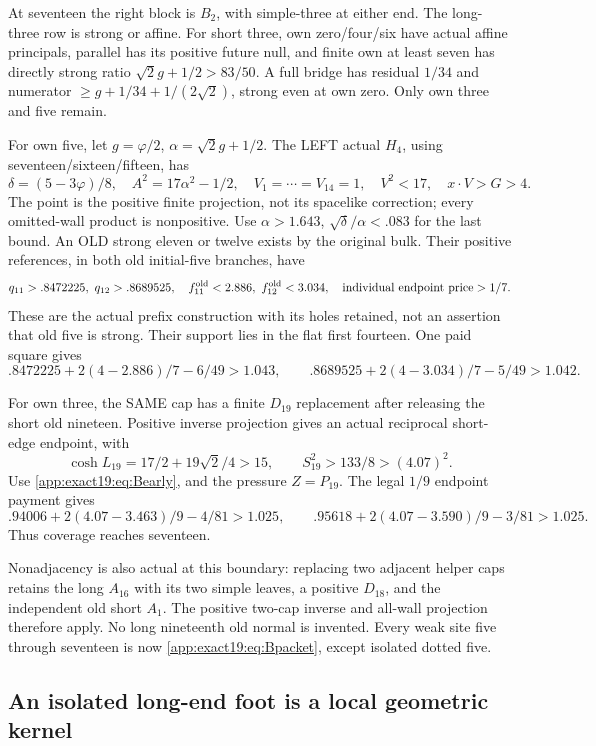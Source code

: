 At seventeen the right block is
\(B_2\), with simple-three at either
end.
The long-three row is strong or
affine.
For short three, own zero/four/six
have actual affine principals,
parallel has its positive future
null, and finite own at least seven
has directly strong ratio
\(\sqrt2g+1/2>83/50\).
A full bridge has residual \(1/34\)
and numerator
\(\ge g+1/34+1/(2\sqrt2)\), strong
even at own zero.
Only own three and five remain.

For own five, let \(g=\varphi/2\),
\(\alpha=\sqrt2g+1/2\).
The LEFT actual \(H_4\), using
seventeen/sixteen/fifteen, has
\[
 \delta=(5-3\varphi)/8,\quad A^2=17\alpha^2-1/2,
 \quad V_1=\cdots=V_{14}=1,\quad V^2<17,
                    \quad x\cdot V>G>4 .
\]
The point is the positive finite
projection, not its spacelike
correction; every omitted-wall
product is nonpositive.
Use \(\alpha>1.643\),
\(\sqrt\delta/\alpha<.083\)
for the last bound.
An OLD strong eleven or twelve
exists by the original bulk.
Their positive references, in both
old initial-five branches, have
\[
 q_{11}>.8472225,\ q_{12}>.8689525,\quad
 f_{11}^{\rm old}<2.886,\ f_{12}^{\rm old}<3.034,
                    \quad\text{individual endpoint price}>1/7 .
\]
These are the actual prefix
construction with its holes retained,
not an assertion that old five is
strong.
Their support lies in the flat
first fourteen.
One paid square gives
\[
 .8472225+2(4-2.886)/7-6/49>1.043,\qquad
 .8689525+2(4-3.034)/7-5/49>1.042 .
\]

For own three, the SAME cap has a
finite \(D_{19}\) replacement after
releasing the short old nineteen.
Positive inverse projection gives
an actual reciprocal short-edge
endpoint, with
\[
 \cosh L_{19}=17/2+19\sqrt2/4>15,\qquad
               S_{19}^2>133/8>(4.07)^2 .
\]
Use \eqref{app:exact19:eq:Bearly},
and the pressure \(Z=P_{19}\).
The legal \(1/9\) endpoint payment
gives
\[
 .94006+2(4.07-3.463)/9-4/81>1.025,\qquad
 .95618+2(4.07-3.590)/9-3/81>1.025 .
\]
Thus coverage reaches seventeen.

Nonadjacency is also actual at this
boundary: replacing two adjacent
helper caps retains the long
\(A_{16}\) with its two simple
leaves, a positive \(D_{18}\), and
the independent old short \(A_1\).
The positive two-cap inverse and
all-wall projection therefore apply.
No long nineteenth old normal is
invented.
Every weak site five through
seventeen is now
\eqref{app:exact19:eq:Bpacket},
except isolated dotted five.

\subsection{An isolated long-end foot is a local geometric kernel}
\label{app:exact19:longfeet}

